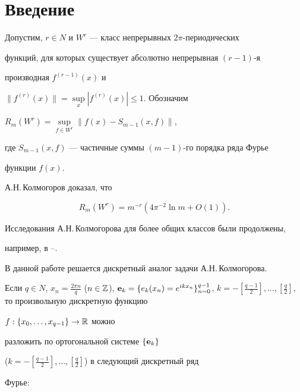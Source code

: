 \label{begin}  


 


 


\section{Введение}  


 


Допустим, $r\in N$ и $W^r$ --- класс непрерывных $2\pi$-периодических 


функций, для которых существует абсолютно непрерывная $(r-1)$-я 


производная $f^{(r-1)}(x)$ и 


$\|f^{(r)}(x)\|=\sup\limits_x|f^{(r)}(x)|\le1$. Обозначим 


$R_m(W^r)=\sup\limits_{f\in W^r}\|f(x)-S_{m-1}(x,f)\|$, 


где $S_{m-1}(x,f)$ --- частичные суммы $(m-1)$-го порядка ряда Фурье 


функции $f(x)$. 


 


А.Н.\,Колмогоров \cite{1} доказал, что 


$$ 


R_m(W^r)=m^{-r}(4\pi^{-2}\ln m+O(1)). 


$$ 


Исследования А.Н.\,Колмогорова для более общих классов были продолжены, 


например, в \cite{2}--\cite{6}. 


 


В данной работе решается дискретный аналог задачи А.Н.\,Колмогорова. 


 


Если $q\in N$, $x_n=\frac{2\pi n}{q}$ ($n\in\Bbb Z$), $\bold 


e_k=\{e_k(x_n)=e^{ikx_n}\}^{q-1}_{n=0}$, $k=-[\frac{q-1}{2}],\dotsc, 


[\frac{q}{2}]$, то произвольную дискретную функцию 


$f:\{x_0,\dotsc,x_{q-1}\}\to\Bbb R$ можно 


разложить по ортогональной системе $\{\bold e_k\}$ 


($k=-[\frac{q-1}{2}],\dotsc,[\frac{q}{2}]$) в следующий дискретный ряд 


Фурье: 


